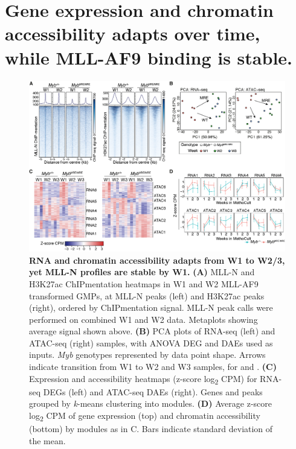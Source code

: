 \section{\label{ch5:profiles}Gene expression and chromatin accessibility adapts over time, while MLL-AF9 binding is stable.}

\begin{figure}[!t]
    \centering
    \includegraphics[width=\textwidth,height=\textheight,keepaspectratio]{figures/chapter5/ch5_profiles.png}
    \caption[{RNA and chromatin accessibility adapts from W1 to W2/3, yet MLL-N profiles are stable by W1.}]
    {\textbf{RNA and chromatin accessibility adapts from W1 to W2/3, yet MLL-N profiles are stable by W1.}
    \textbf{(A)} MLL-N and H3K27ac ChIPmentation heatmaps in W1 and W2 MLL-AF9 transformed GMPs, at MLL-N peaks (left) and H3K27ac peaks (right), ordered by ChIPmentation signal. MLL-N peak calls were performed on combined W1 and W2 data. Metaplots showing average signal shown above.
    \textbf{(B)} PCA plots of RNA-seq (left) and ATAC-seq (right) samples, with ANOVA DEG and DAEs used as inputs. \textit{Myb} genotypes represented by data point shape. Arrows indicate transition from W1 to W2 and W3 samples, for \mybwt{} and \mybmre{}.
    \textbf{(C)} Expression and accessibility heatmaps (z-score log\textsubscript{2} CPM) for RNA-seq DEGs  (left) and ATAC-seq DAEs (right). Genes and peaks grouped by \textit{k}-means clustering into modules. 
    \textbf{(D)} Average z-score log\textsubscript{2} CPM of gene expression (top) and chromatin accessibility (bottom) by modules as in C. Bars indicate standard deviation of the mean.
    }
    \label{fig:ch5_profiles}
\end{figure}


